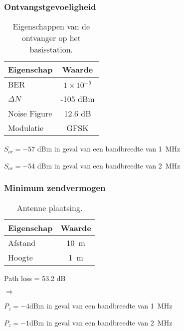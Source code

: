\begin{frame}
    \frametitle{Ontvangstgevoeligheid}

    \begin{table}
        \centering
        \begin{tabular}{l|c}
            Eigenschap & Waarde \\\hline
            BER & $1\times10^{-5}$ \\
            $\Delta N$ & -105 dBm \\
            Noise Figure & 12.6 dB \\
            Modulatie & GFSK \\
        \end{tabular}
        \caption{Eigenschappen van de ontvanger op het basisstation.}
    \end{table}

    \pause 

    $S_{or}=-57$ dBm in geval van een bandbreedte van \qty{1}{\mega\hertz}

    $S_{or}=-54$ dBm in geval van een bandbreedte van \qty{2}{\mega\hertz}

\end{frame}

\begin{frame}
    \frametitle{Minimum zendvermogen}

    \begin{table}
        \centering
        \begin{tabular}{l|c}
            Eigenschap & Waarde \\\hline
            Afstand & \qty{10}{\meter} \\
            Hoogte & \qty{1}{\meter} \\
        \end{tabular}
        \caption{Antenne plaatsing.}
    \end{table}

    Path loss = 53.2 dB

    \pause

    $\Rightarrow$

    $P_{z}=-4$dBm in geval van een bandbreedte van \qty{1}{\mega\hertz}

    $P_{z}=-1$dBm in geval van een bandbreedte van \qty{2}{\mega\hertz}
\end{frame}

